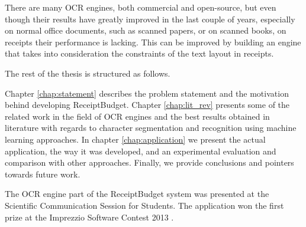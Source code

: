 There are many OCR engines, both commercial and open-source, but even though their results have greatly improved in the last couple of years, especially on normal office documents, such as scanned papers, or on scanned books, on receipts their performance is lacking. This can be improved by building an engine that takes into consideration the constraints of the text layout in receipts. 

The rest of the thesis is structured as follows.

Chapter \ref{chap:statement} describes the problem statement and the motivation behind developing ReceiptBudget. Chapter \ref{chap:lit_rev} presents some of the related work in the field of OCR engines and the best results obtained in literature with regards to character segmentation and  recognition using machine learning approaches. In chapter \ref{chap:application} we present the actual application, the way it was developed, and an experimental evaluation and comparison with other approaches. Finally, we provide conclusions and pointers towards future work. 

The OCR engine part of the ReceiptBudget system was presented at the Scientific Communication Session for Students. The application won the first prize at the Imprezzio Software Contest 2013 \cite{imprezzio}. 